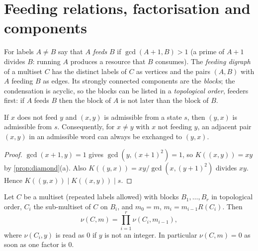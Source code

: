 \section{Feeding relations, factorisation and components}\label{sec:feeding}
\begin{definition}\label{def:feeding}
For labels $A\ne B$ say that $A$ \emph{feeds} $B$ if $\gcd(A+1,B)>1$ (a prime of $A+1$ divides $B$: running $A$ produces a resource that $B$ consumes). The \emph{feeding digraph} of a multiset $C$ has the distinct labels of $C$ as vertices and the pairs $(A,B)$ with $A$ feeding $B$ as edges. Its strongly connected components are the \emph{blocks}; the condensation is acyclic, so the blocks can be listed in a \emph{topological order}, feeders first: if $A$ feeds $B$ then the block of $A$ is not later than the block of $B$.
\end{definition}
\begin{lemma}\label{lem:NF}
If $x$ does not feed $y$ and $(x,y)$ is admissible from a state $s$, then $(y,x)$ is admissible from $s$. Consequently, for $x\neq y$ with $x$ not feeding $y$, an adjacent pair $(x,y)$ in an admissible word can always be exchanged to $(y,x)$.
\end{lemma}
\begin{proof}
$\gcd(x+1,y)=1$ gives $\gcd(y,(x+1)^2)=1$, so $K((x,y))=xy$ by \cref{prop:diamond}(a). Also $K((y,x))=xy/\gcd(x,(y+1)^2)$ divides $xy$. Hence $K((y,x))\mid K((x,y))\mid s$.
\end{proof}
\begin{theorem}\label{thm:F2}
Let $C$ be a multiset (repeated labels allowed) with blocks $B_1,\dots,B_r$ in topological order, $C_i$ the sub-multiset of $C$ on $B_i$, and $m_0=m$, $m_i=m_{i-1}R(C_i)$. Then
\[
 \nu(C,m)=\prod_{i=1}^r\nu(C_i,m_{i-1}),
\]
where $\nu(C_i,y)$ is read as $0$ if $y$ is not an integer. In particular $\nu(C,m)=0$ as soon as one factor is $0$.
\end{theorem}
